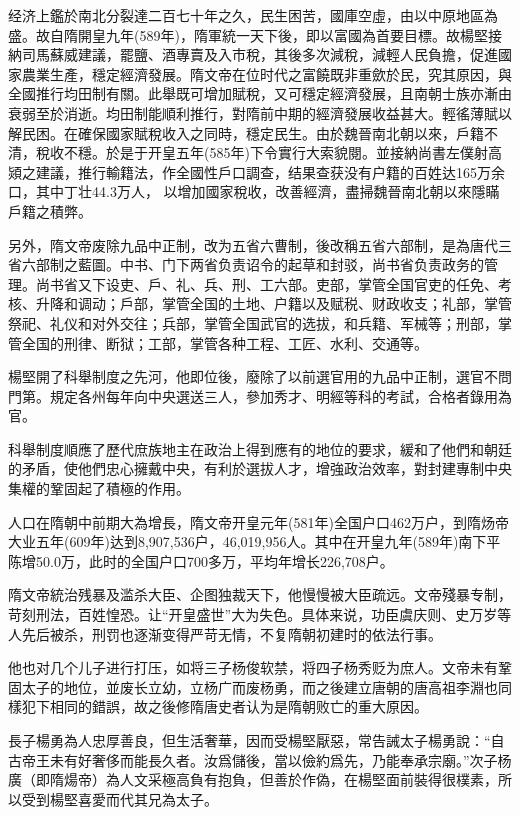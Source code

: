 经济上鑑於南北分裂達二百七十年之久，民生困苦，國庫空虛，由以中原地區為盛。故自隋開皇九年(589年)，隋軍統一天下後，即以富國為首要目標。故楊堅接納司馬蘇威建議，罷鹽、酒專賣及入市稅，其後多次減稅，減輕人民負擔，促進國家農業生產，穩定經濟發展。隋文帝在位时代之富饒既非重歛於民，究其原因，與全國推行均田制有關。此舉既可增加賦稅，又可穩定經濟發展，且南朝士族亦漸由衰弱至於消逝。均田制能順利推行，對隋前中期的經濟發展收益甚大。輕徭薄賦以解民困。在確保國家賦稅收入之同時，穩定民生。由於魏晉南北朝以來，戶籍不清，稅收不穩。於是于开皇五年(585年)下令實行大索貌閱。並接納尚書左僕射高熲之建議，推行輸籍法，作全國性戶口調查，结果查获没有户籍的百姓达165万余口，其中丁壮44.3万人， 以增加國家稅收，改善經濟，盡掃魏晉南北朝以來隱瞞戶籍之積弊。

另外，隋文帝废除九品中正制，改为五省六曹制，後改稱五省六部制，是為唐代三省六部制之藍圖。中书、门下两省负责诏令的起草和封驳，尚书省负责政务的管理。尚书省又下设吏、戶、礼、兵、刑、工六部。吏部，掌管全国官吏的任免、考核、升降和调动；戶部，掌管全国的土地、户籍以及赋税、财政收支；礼部，掌管祭祀、礼仪和对外交往；兵部，掌管全国武官的选拔，和兵籍、军械等；刑部，掌管全国的刑律、断狱；工部，掌管各种工程、工匠、水利、交通等。

楊堅開了科舉制度之先河，他即位後，廢除了以前選官用的九品中正制，選官不問門第。規定各州每年向中央選送三人，參加秀才、明經等科的考試，合格者錄用為官。

科舉制度順應了歷代庶族地主在政治上得到應有的地位的要求，緩和了他們和朝廷的矛盾，使他們忠心擁戴中央，有利於選拔人才，增強政治效率，對封建專制中央集權的鞏固起了積極的作用。

人口在隋朝中前期大為增長，隋文帝开皇元年(581年)全国户口462万户，到隋炀帝大业五年(609年)达到8,907,536户，46,019,956人。其中在开皇九年(589年)南下平陈增50.0万，此时的全国户口700多万，平均年增长226,708户。

隋文帝統治残暴及滥杀大臣、企图独裁天下，他慢慢被大臣疏远。文帝殘暴专制，苛刻刑法，百姓惶恐。让“开皇盛世”大为失色。具体来说，功臣虞庆则、史万岁等人先后被杀，刑罚也逐渐变得严苛无情，不复隋朝初建时的依法行事。

他也对几个儿子进行打压，如将三子杨俊软禁，将四子杨秀贬为庶人。文帝未有鞏固太子的地位，並废长立幼，立杨广而废杨勇，而之後建立唐朝的唐高祖李淵也同樣犯下相同的錯誤，故之後修隋唐史者认为是隋朝败亡的重大原因。

長子楊勇為人忠厚善良，但生活奢華，因而受楊堅厭惡，常告誡太子楊勇說：“自古帝王未有好奢侈而能長久者。汝爲儲後，當以儉約爲先，乃能奉承宗廟。”次子杨廣（即隋煬帝）為人文采極高負有抱負，但善於作偽，在楊堅面前裝得很樸素，所以受到楊堅喜愛而代其兄為太子。

